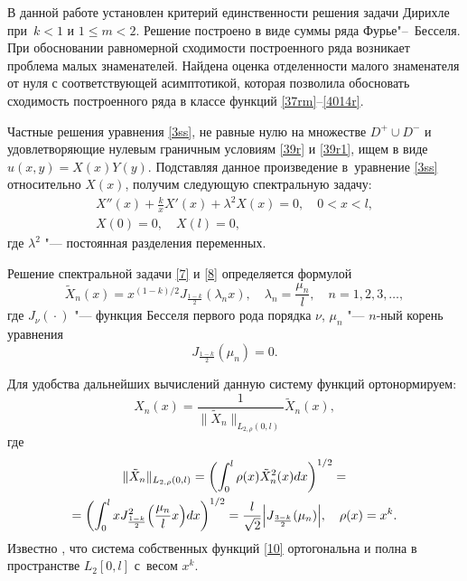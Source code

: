 В данной работе установлен критерий единственности решения задачи Дирихле при~$k<1$ и $1\leq m<2$. 
Решение построено в виде суммы ряда Фурье"--~Бесселя. 
При обосновании равномерной сходимости построенного ряда возникает проблема малых знаменателей. 
Найдена оценка отделенности малого знаменателя от нуля с соответствующей
асимптотикой, которая позволила обосновать сходимость построенного ряда в классе функций \eqref{37rm}--\eqref{4014r}.

\smallskip

Частные решения уравнения
\eqref{3ss}, не равные нулю на множестве $D^{+}\cup D^{-}$ и
удовлетворяющие нулевым граничным условиям \eqref{39r} и
\eqref{39r1}, ищем в виде $u(x,y)=X(x)Y(y).$  
Подставляя данное произведение в~уравнение \eqref{3ss} относительно $X(x)$, получим следующую спектральную задачу:
\begin{gather}\label{7}
X''(x)+\frac{k}{x}X'(x)+\lambda^{2} X(x)=0,  \quad  0<x<l,
\\
\label{8}
X(0)=0, \quad  X(l)=0,
\end{gather}
где $\lambda^2$ "--- постоянная разделения переменных.

Решение спектральной задачи \eqref{7} и \eqref{8} определяется формулой
\begin{equation}
\tilde X_{n}(x)=x^{({1-k})/{2}}J_{\frac{1-k}{2}}(\lambda_{n}x),
\quad 
\lambda_{n}=\frac{\mu_{n}}{l},  \quad  n=1, 2, 3, \dots,
\end{equation}
где $J_{\nu}({}\cdot{})$ "--- функция Бесселя первого рода порядка $\nu$, 
$\mu_{n}$ "--- $n$-ный корень уравнения $$J_{\frac{1-k}{2}}(\mu_{n})=0.$$

Для удобства дальнейших вычислений данную систему функций ортонормируем:
\begin{equation}
\label{10}
X_{n}(x)=  \frac{1}{\| \tilde X_{n} \|_{L_{2, \rho} (0, l)}} \tilde X_{n}(x),
\end{equation}
где 
\begin{multline}
\| \tilde X_{n} \|_{L_{2, \rho} (0, l)} =
\biggl(
\int_0^l \rho (x)  \tilde X_{n}^2(x) dx 
\biggr)^{1/2} =
\\
= 
\biggl(
\int_0^l x J^2_{\frac{1-k}{2}} \Bigl(\frac {\mu_{n}}lx \Bigr) 
dx 
\biggr)^{1/2} = 
\frac{l}{\sqrt 2} 
\Bigl| 
J_{\frac{3-k}{2}} (\mu_n)
\Bigr|, \quad \rho (x) = x^k.
\end{multline}
Известно \cite[Sect.~18.1]{safina:Vgn}, что система собственных функций
\eqref{10} ортогональна и полна в пространстве $L_{2}[0, l]$  с~весом $x^k$.



